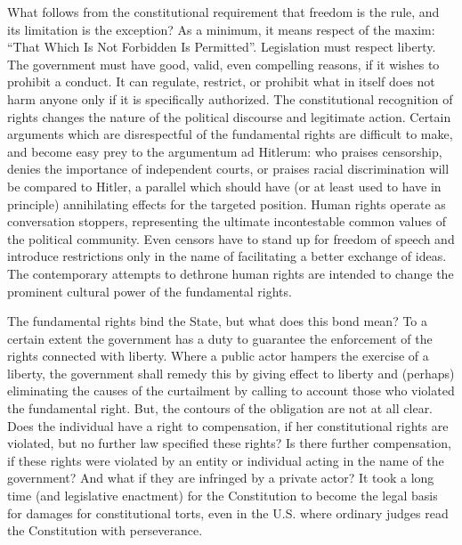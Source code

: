 \begin{multicols}{2}

\noi
What follows from the constitutional requirement that freedom is the rule, and its limitation is
the exception? As a minimum, it means respect of the maxim: “That Which Is Not Forbidden
Is Permitted”. Legislation must respect liberty. The government must have good, valid, even
compelling reasons, if it wishes to prohibit a conduct. It can regulate, restrict, or prohibit
what in itself does not harm anyone only if it is specifically authorized. The constitutional
recognition of rights changes the nature of the political discourse and legitimate action.
Certain arguments which are disrespectful of the fundamental rights are difficult to make, and
become easy prey to the argumentum ad Hitlerum: who praises censorship, denies the
importance of independent courts, or praises racial discrimination will be compared to Hitler,
a parallel which should have (or at least used to have in principle) annihilating effects for the
targeted position. Human rights operate as conversation stoppers, representing the ultimate
incontestable common values of the political community. Even censors have to stand up for
freedom of speech and introduce restrictions only in the name of facilitating a better exchange of ideas. The contemporary attempts to dethrone human rights are intended to
change the prominent cultural power of the fundamental rights.

\vspace{-.1cm}

\noi
The fundamental rights bind the State, but what does this bond mean? To a certain extent the
government has a duty to guarantee the enforcement of the rights connected with liberty.
Where a public actor hampers the exercise of a liberty, the government shall remedy this by
giving effect to liberty and (perhaps) eliminating the causes of the curtailment by calling to
account those who violated the fundamental right. But, the contours of the obligation are not
at all clear. Does the individual have a right to compensation, if her constitutional rights are
violated, but no further law specified these rights? Is there further compensation, if these
rights were violated by an entity or individual acting in the name of the government? And
what if they are infringed by a private actor? It took a long time (and legislative enactment)
for the Constitution to become the legal basis for damages for constitutional torts, even in the
U.S. where ordinary judges read the Constitution with perseverance.


\end{multicols}
